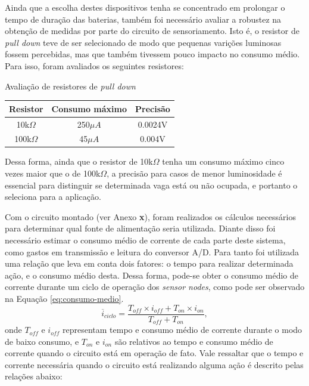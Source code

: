 \documentclass[oneside,openright,12pt]{ufsm_2015} %
\begin{document}
    Ainda que a escolha destes dispositivos tenha se concentrado em prolongar o tempo de duração das baterias, também foi necessário avaliar a robustez na obtenção de medidas por parte do circuito de sensoriamento. Isto é, o resistor de \textit{pull down} teve de ser selecionado de modo que pequenas varições luminosas fossem percebidas, mas que também tivessem pouco impacto no consumo médio. Para isso, foram avaliados os seguintes resistores:
    
    \begin{quadro}\label{quadro:resistores-pd}
   	    \caption{Avaliação de resistores de \textit{pull down}}
	    \centering
	    \begin{tabular}{| c |c |c |}
	    \hline
	    Resistor & Consumo máximo & Precisão \\
	    \hline
	    10k$\Omega$ & 250$\mu A$ & 0.0024V\\
	    \hline
	    100k$\Omega$ & 45$\mu A$ & 0.004V\\
	    \hline
	    \end{tabular}
	    \vspace{\baselineskip} %
    \end{quadro}
    
    Dessa forma, ainda que o resistor de 10k$\Omega$ tenha um consumo máximo cinco vezes maior que o de 100k$\Omega$, a precisão para casos de menor luminosidade é essencial para distinguir se determinada vaga está ou não ocupada, e portanto o seleciona para a aplicação.
    
    Com o circuito montado (ver Anexo \textbf{x}), foram realizados os cálculos necessários para determinar qual fonte de alimentação seria utilizada. Diante disso foi necessário estimar o consumo médio de corrente de cada parte deste sistema, como gastos em transmissão e leitura do conversor A/D. Para tanto
    foi utilizada uma relação que leva em conta dois fatores: o tempo para realizar determinada ação, e o consumo médio desta. Dessa forma, pode-se obter o consumo médio de corrente durante um ciclo de operação dos \textit{sensor nodes}, como pode ser observado na Equação \ref{eq:consumo-medio}.
    \begin{equation}\label{eq:consumo-medio}
        \overline{i}_{ciclo} = \frac{T_{off}\times i_{off} + T_{on}\times i_{on}}{T_{off}+T_{on}},
    \end{equation}
    onde $T_{off}$ e $i_{off}$ representam tempo e consumo médio de corrente durante o modo de baixo consumo, e $T_{on}$ e $i_{on}$ são relativos ao tempo e consumo médio de corrente quando o circuito está em operação de fato. Vale ressaltar que o tempo e corrente necessária quando o circuito está realizando alguma ação é descrito pelas relações abaixo:
    
\end{document}
